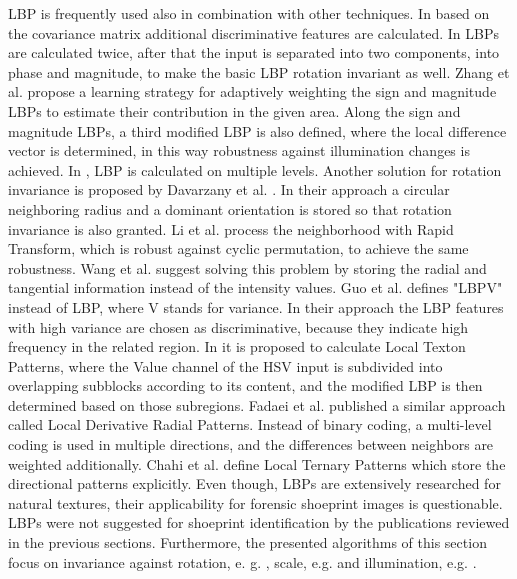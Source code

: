 \documentclass[draft,final]{vutinfth} %
\begin{document}
LBP is frequently used also in combination with other techniques. 
In \cite{hong2014combining} based on the covariance matrix additional discriminative features are calculated. 
In \cite{guo2010completed} LBPs are calculated twice, after that the input is separated into two components, into phase and magnitude, to make the basic LBP rotation invariant as well.
Zhang et al.  \cite{zhang2017learning} propose a learning strategy for adaptively weighting the sign and magnitude LBPs to estimate their contribution in the given area. 
Along the sign and magnitude LBPs, a third modified LBP is also defined, where the local difference vector is determined, in this way robustness against illumination changes is achieved.
In \cite{khellah2011texture}, LBP is calculated on multiple levels.
Another solution for rotation invariance is proposed by Davarzany et al. \cite{davarzani2015scale}. 
In their approach a circular neighboring radius and a dominant orientation is stored so that rotation invariance is also granted.
Li et al. \cite{li2014rapid} process the neighborhood with Rapid Transform, which is robust against cyclic permutation, to achieve the same robustness.
Wang et al. \cite{wang2017local} suggest solving this problem by storing the radial and tangential information instead of the intensity values.
Guo et al. \cite{guo2010rotation} defines "LBPV" instead of LBP, where V stands for variance. 
In their approach the LBP features with high variance are chosen as discriminative, because they indicate high frequency in the related region.
In \cite{bala2016local} it is proposed to calculate Local Texton Patterns, where the Value channel of the HSV input is subdivided into overlapping subblocks according to its content, and the modified LBP is then determined based on those subregions.
Fadaei et al. \cite{fadaei2017local} published a similar approach called Local Derivative Radial Patterns.
Instead of binary coding, a multi-level coding is used in multiple directions, and the differences between neighbors are weighted additionally. 
Chahi et al. \cite{chahi2018local} define Local Ternary Patterns which store the directional patterns explicitly.
Even though, LBPs are extensively researched for natural textures, their applicability for forensic shoeprint images is questionable.
LBPs were not suggested for shoeprint identification by the publications reviewed in the previous sections.
Furthermore, the presented algorithms of this section focus on invariance against rotation, e. g. \cite{khellah2011texture}, scale, e.g. \cite{davarzani2015scale}  and illumination, e.g. \cite{zhang2017learning}.
\end{document}
